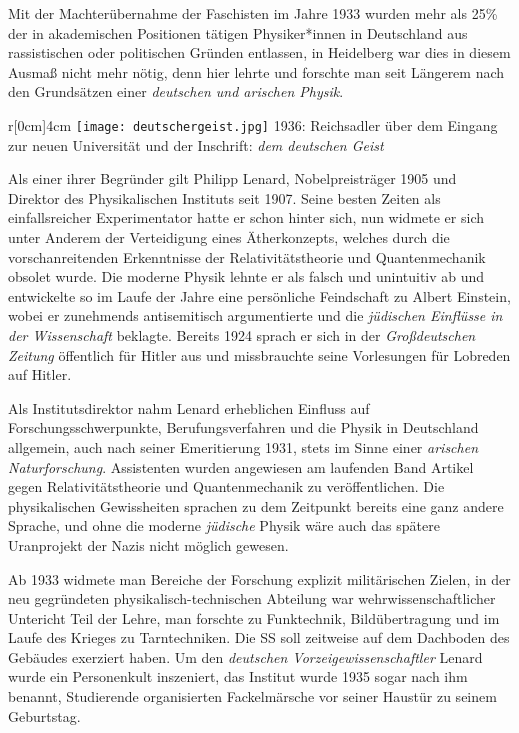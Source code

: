 Mit der Machterübernahme der Faschisten im Jahre 1933 wurden mehr als 25\% der in akademischen Positionen tätigen Physiker*innen in Deutschland aus rassistischen oder politischen Gründen entlassen, in Heidelberg war dies in diesem Ausmaß nicht mehr nötig, denn hier lehrte und forschte man seit Längerem nach den Grundsätzen einer \textit{deutschen und arischen Physik}.

\begin{wrapfigure}{r}[0cm]{4cm}
\texttt{[image: deutschergeist.jpg]}
\small{1936: Reichsadler über dem Eingang zur neuen Universität und der Inschrift: \textit{dem deutschen Geist}}
\vspace{-15pt}
\end{wrapfigure}

Als einer ihrer Begründer gilt Philipp Lenard, Nobelpreisträger 1905 und Direktor des Physikalischen Instituts seit 1907. 
Seine besten Zeiten als einfallsreicher Experimentator hatte er schon hinter sich, nun widmete er sich unter Anderem der Verteidigung eines Ätherkonzepts, welches durch die vorschanreitenden Erkenntnisse der Relativitätstheorie und Quantenmechanik obsolet wurde. Die moderne Physik lehnte er als falsch und unintuitiv ab und entwickelte so im Laufe der Jahre eine persönliche Feindschaft zu Albert Einstein, wobei er zunehmends antisemitisch argumentierte und die \textit{jüdischen Einflüsse in der Wissenschaft} beklagte. Bereits 1924 sprach er sich in der \textit{Großdeutschen Zeitung} öffentlich für Hitler aus und missbrauchte seine Vorlesungen für Lobreden auf Hitler.

Als Institutsdirektor nahm Lenard erheblichen Einfluss auf Forschungsschwerpunkte, Berufungsverfahren und die Physik in Deutschland allgemein, auch nach seiner Emeritierung 1931, stets im Sinne einer \textit{arischen Naturforschung}. Assistenten wurden angewiesen am laufenden Band Artikel gegen Relativitätstheorie und Quantenmechanik zu veröffentlichen. Die physikalischen Gewissheiten sprachen zu dem Zeitpunkt bereits eine ganz andere Sprache, und ohne die moderne \textit{jüdische} Physik wäre auch das spätere Uranprojekt der Nazis nicht möglich gewesen. 

Ab 1933 widmete man Bereiche der Forschung explizit militärischen Zielen, in der neu gegründeten physikalisch-technischen Abteilung war wehrwissenschaftlicher Untericht Teil der Lehre, man forschte zu Funktechnik, Bildübertragung und im Laufe des Krieges zu Tarntechniken. Die SS soll zeitweise auf dem Dachboden des Gebäudes exerziert haben.
Um den \textit{deutschen Vorzeigewissenschaftler} Lenard wurde ein Personenkult inszeniert, das Institut wurde 1935 sogar nach ihm benannt, Studierende organisierten Fackelmärsche vor seiner Haustür zu seinem Geburtstag. 

